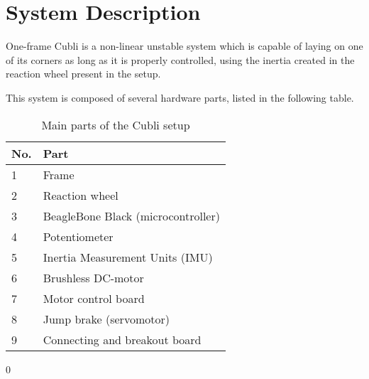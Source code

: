 \chapter{System Description}\label{systemDescription}
One-frame Cubli is a non-linear unstable system which is capable of laying on one of its corners as long as it is properly controlled, using the inertia created in the reaction wheel present in the setup.



This system is composed of several hardware parts, listed in the following table. 

\begin{table}[H]
	\begin{tabular}{|l|p{6.7cm}|}
		\hline %
		\textbf{No.} &\textbf{Part} 			\\
		\hline %
		1            & Frame           			\\
		\hline %
		2            & Reaction wheel      		\\
		\hline %
		3            & BeagleBone Black (microcontroller)  \\
		\hline %
		4            & Potentiometer			\\
		\hline %
		5            & Inertia Measurement Units (IMU)       			\\
		\hline %
		6            & Brushless DC-motor   	\\
		\hline %
		7            & Motor control board     	\\
		\hline %
		8            & Jump brake (servomotor)		    	\\
		\hline %
		9            & Connecting and breakout board		    	\\
		\hline %
	\end{tabular}0
	\caption{Main parts of the Cubli setup}
\label{TableAAUCubliComponent}
\end{table}


